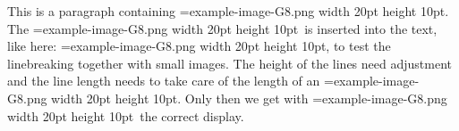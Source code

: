 \def\img{\HINTimage=example-image-G8.png width 20pt height 10pt\relax}

This is a paragraph containing \img. The \img\ is inserted into
the text, like here: \img, to test the linebreaking together with
small images. The height of the lines need adjustment and the
line length needs to take care of the length of an \img. Only then
we get with \img\ the correct display.

\vfill
\bye
